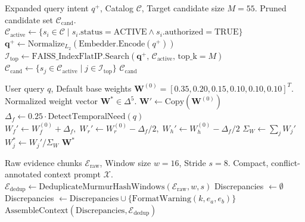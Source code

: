 \documentclass[conference,onecolumn,10pt]{IEEEtran}
\begin{document}
\begin{algorithm}[h]
\caption{Two-Stage Scalable Vector Pre-filtering Funnel}
\label{alg:funnel}
\begin{algorithmic}[1]
\REQUIRE Expanded query intent $q^+$, Catalog $\mathcal{C}$, Target candidate size $M = 55$.
\ENSURE Pruned candidate set $\mathcal{C}_{\text{cand}}$.
\STATE $\mathcal{C}_{\text{active}} \leftarrow \{s_i \in \mathcal{C} \mid s_i.\text{status} = \text{ACTIVE} \land s_i.\text{authorized} = \text{TRUE}\}$
\STATE $\mathbf{q}^+ \leftarrow \text{Normalize}_{L_2}(\text{Embedder}.\text{Encode}(q^+))$
\STATE $\mathcal{I}_{\text{top}} \leftarrow \text{FAISS\_IndexFlatIP}.\text{Search}(\mathbf{q}^+, \, \mathcal{C}_{\text{active}}, \, \text{top\_k} = M)$
\STATE $\mathcal{C}_{\text{cand}} \leftarrow \{s_j \in \mathcal{C}_{\text{active}} \mid j \in \mathcal{I}_{\text{top}}\}$
\RETURN $\mathcal{C}_{\text{cand}}$
\end{algorithmic}
\end{algorithm}

\begin{algorithm}[h]
\caption{Dynamic Query-Aware Weight Normalization}
\label{alg:dynamic_weights}
\begin{algorithmic}[1]
\REQUIRE User query $q$, Default base weights $\mathbf{W}^{(0)} = [0.35, 0.20, 0.15, 0.10, 0.10, 0.10]^T$.
\ENSURE Normalized weight vector $\mathbf{W}^* \in \Delta^5$.
\STATE $\mathbf{W}' \leftarrow \text{Copy}(\mathbf{W}^{(0)})$
    \STATE $\Delta_f \leftarrow 0.25 \cdot \text{DetectTemporalNeed}(q)$
    \STATE $W_f' \leftarrow W_f^{(0)} + \Delta_f, \; W_r' \leftarrow W_r^{(0)} - \Delta_f / 2, \; W_h' \leftarrow W_h^{(0)} - \Delta_f / 2$
\ENDIF
\STATE $\Sigma_W \leftarrow \sum_{j} W_j'$
    \STATE $W_j^* \leftarrow W_j' / \Sigma_W$
\ENDFOR
\RETURN $\mathbf{W}^*$
\end{algorithmic}
\end{algorithm}

\begin{algorithm}[h]
\caption{Multi-Source Evidence Fusion and Conflict Mitigation}
\label{alg:evidence_fusion}
\begin{algorithmic}[1]
\REQUIRE Raw evidence chunks $\mathcal{E}_{\text{raw}}$, Window size $w = 16$, Stride $s = 8$.
\ENSURE Compact, conflict-annotated context prompt $\mathcal{X}$.
\STATE $\mathcal{E}_{\text{dedup}} \leftarrow \text{DeduplicateMurmurHashWindows}(\mathcal{E}_{\text{raw}}, w, s)$
\STATE Discrepancies $\leftarrow \emptyset$
            \STATE Discrepancies $\leftarrow \text{Discrepancies} \cup \{\text{FormatWarning}(k, e_a, e_b)\}$
        \ENDIF
    \ENDFOR
\ENDFOR
\RETURN $\text{AssembleContext}(\text{Discrepancies}, \mathcal{E}_{\text{dedup}})$
\end{algorithmic}
\end{algorithm}
\end{document}
